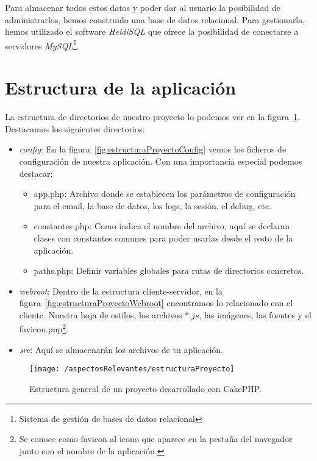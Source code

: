 Para almacenar todos estos datos y poder dar al usuario la posibilidad de administrarlos, hemos construido una base de datos relacional. Para gestionarla, hemos utilizado el software \textit{HeidiSQL} que ofrece la posibilidad de conectarse a servidores \textit{MySQL}\footnote{Sistema de gestión de bases de datos relacional}.

\section{Estructura de la aplicación}

La estructura de directorios de nuestro proyecto lo podemos ver en la figura~\ref{fig:estructuraProyecto}. Destacamos los siguientes directorios:

\begin{itemize}
	\item \textit{config}: En la figura~\ref{fig:estructuraProyectoConfig} vemos los ficheros de configuración de nuestra aplicación. Con una importancia especial podemos destacar: 
	\begin{itemize}
		\item app.php: Archivo donde se establecen los parámetros de configuración para el email, la base de datos, los logs, la sesión, el debug, etc.
		\item constantes.php: Como indica el nombre del archivo, aquí se declaran clases con constantes comunes para poder usarlas desde el resto de la aplicación.
		\item paths.php: Definir variables globales para rutas de directorios concretos.
	\end{itemize}
		
	\item \textit{webroot}: Dentro de la estructura cliente-servidor, en la figura~\ref{fig:estructuraProyectoWebroot} encontramos lo relacionado con el cliente. Nuestra hoja de estilos, los archivos $*.js$, las imágenes, las fuentes y el favicon.pnp\footnote{Se conoce como favicon al icono que aparece en la pestaña del navegador junto con el nombre de la aplicación.}.
	
	\item \textit{src}: Aquí se almacenarán los archivos de tu aplicación.
\end{itemize}

\begin{figure}[ht]
	\centering
	\texttt{[image: /aspectosRelevantes/estructuraProyecto]}
	\caption{Estructura general de un proyecto desarrollado con CakePHP.}
	\label{fig:estructuraProyecto}
\end{figure}

